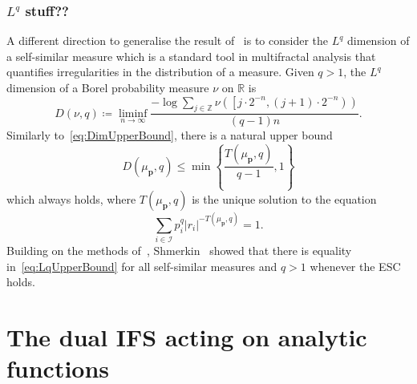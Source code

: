 \documentclass[12pt,]{article}
\theoremstyle{definition}
\theoremstyle{remark}
\newcommand{\0}{\mathbf{0}}
\begin{document}
{\subsubsection{$L^q$ stuff??}

A different direction to generalise the result of~\cite{Hochman_SelfSimESC_Annals} is to consider the $L^q$ dimension of a self-similar measure which is a standard tool in multifractal analysis that quantifies irregularities in the distribution of a measure. Given $q>1$, the $L^q$ dimension of a Borel probability measure $\nu$ on $\mathbb{R}$ is 
\begin{equation*}
D(\nu, q)\coloneqq\liminf _{n \rightarrow \infty} \frac{-\log \sum_{j \in \mathbb{Z}} \nu\left(\left[j \cdot 2^{-n},(j+1) \cdot 2^{-n}\right)\right)}{(q-1) n} .
\end{equation*}
Similarly to~\cref{eq:DimUpperBound}, there is a natural upper bound 
\begin{equation}\label{eq:LqUpperBound}
	D(\mu_{\mathbf{p}}, q) \leq \min \left\{\frac{T(\mu_{\mathbf{p}}, q)}{q-1} ,1\right\}
\end{equation}
which always holds, where $T(\mu_{\mathbf{p}}, q)$ is the unique solution to the equation
\begin{equation*}
	\sum_{i \in \mathcal{I}} p_i^q\left|r_i\right|^{-T(\mu_{\mathbf{p}}, q)}=1 .
\end{equation*}
Building on the methods of~\cite{Hochman_SelfSimESC_Annals}, Shmerkin~\cite{Shmerkin_LqSelfSim_Annals}  showed that there is equality in~\cref{eq:LqUpperBound} for all self-similar measures and $q>1$ whenever the ESC holds. 

\section{The dual IFS acting on analytic functions}\label{sec:DualIFSFull}

}
\end{document}
